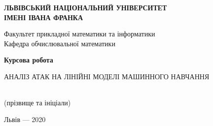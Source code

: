 \documentclass[a4paper,14pt]{extreport}
\begin{document}
	\begin{titlepage}%
    	\begin{center}
	    	{\textbf{ЛЬВІВСЬКИЙ НАЦІОНАЛЬНИЙ УНІВЕРСИТЕТ \\ ІМЕНІ ІВАНА ФРАНКА}}\par
	       	{Факультет прикладної математики та інформатики \\ Кафедра обчислювальної математики}\par
			\begin{center}
	
	        \end{center}
	        \vspace{25mm}
	        {\textbf{\huge{Курсова робота}}}\par
	        \vspace{5mm}
	        {АНАЛІЗ АТАК НА ЛІНІЙНІ МОДЕЛІ МАШИННОГО НАВЧАННЯ}\par
	        \vspace{5mm}
	        {}\par %
        \end{center}
	   	
	   	\vspace{30mm}
	   	
		\begin{flushright}
   	   		\begin{minipage}[t]{107mm}
   	   			 \\
	   	   		{\small{
			   	   		\hfill \footnotesize{(прізвище та ініціали)} \\
			   	   		\vspace{2ex}
				}}
   	   		\end{minipage}
   	   \end{flushright}
	   \vfill
   	   
   	   \begin{center}Львів --- 2020\end{center}
    \end{titlepage}
	\tableofcontents
\end{document}
